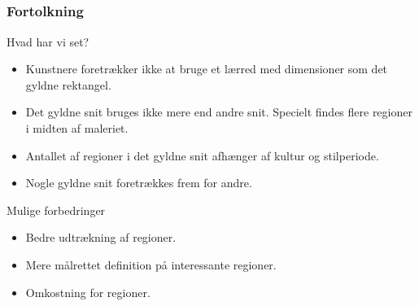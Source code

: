 \documentclass[xcolor=table]{beamer}
\begin{document}
\subsection*{}
\begin{frame}

    \frametitle{Fortolkning}

    \begin{block}{Hvad har vi set?}
        \begin{itemize}
            \item<1-> Kunstnere foretrækker ikke at bruge et lærred med dimensioner som det gyldne rektangel.
            \item<2-> Det gyldne snit bruges ikke mere end andre snit. Specielt findes flere regioner i midten af maleriet.
            \item<3-> Antallet af regioner i det gyldne snit afhænger af kultur og stilperiode.
            \item<4-> Nogle gyldne snit foretrækkes frem for andre.
        \end{itemize}
    \end{block}

    \begin{block}{Mulige forbedringer}
        \begin{itemize}
            \item Bedre udtrækning af regioner.
            \item Mere målrettet definition på interessante regioner.
            \item Omkostning for regioner.
        \end{itemize}
    \end{block}

\end{frame}
\end{document}

